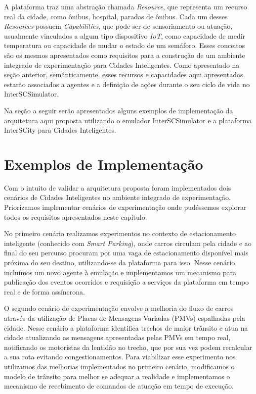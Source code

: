 A plataforma traz uma abstração chamada \textit{Resource}, que representa um recurso real da cidade, como ônibus, hospital, paradas de ônibus.
Cada um desses \textit{Resources} possuem \textit{Capabilities}, que pode ser de sensoriamento ou atuação, usualmente vinculados a algum tipo dispositivo \textit{IoT},
como capacidade de medir temperatura ou capacidade de mudar o estado de um semáforo.
Esses conceitos são os mesmos apresentados como requisitos para a construção de um ambiente integrado de experimentação para Cidades Inteligentes.
Como apresentado na seção anterior, semânticamente, esses recursos e capacidades aqui apresentados estarão associados a agentes e a definição de ações durante o seu
ciclo de vida no InterSCSimulator.

Na seção a seguir serão apresentados alguns exemplos de implementação da arquitetura aqui proposta utilizando o emulador InterSCSimulator e a plataforma InterSCity
para Cidades Inteligentes.

\section{Exemplos de Implementação}

Com o intuito de validar a arquitetura proposta foram implementados dois cenários de Cidades Inteligentes no ambiente integrado de experimentação.
Priorizamos implementar cenários de experimentação onde pudéssemos explorar todos os requisitos apresentados neste capítulo.

No primeiro cenário realizamos experimentos no contexto de estacionamento inteligente (conhecido com \textit{Smart Parking}), onde carros circulam pela cidade e ao
final do seu percurso procuram por uma vaga de estacionamento disponível mais próxima do seu destino, utilizando-se da plataforma para isso.
Nesse cenário, incluímos um novo agente à emulação e implementamos um mecanismo para publicação dos eventos ocorridos e requisição a serviços da plataforma em tempo real
e de forma assíncrona.

O segundo cenário de experimentação envolve a melhoria do fluxo de carros através da utilização de Placas de Mensagens Variadas (PMVs) espalhadas pela cidade.
Nesse cenário a plataforma identifica trechos de maior trânsito e atua na cidade atualizando as mensagens apresentadas pelas PMVs em tempo real, notificando os
motoristas da lentidão no trecho, que por sua vez podem recalcular a sua rota evitando congestionamentos.
Para viabilizar esse experimento nos utilizamos das melhorias implementados no primeiro cenário, modificamos o modelo de trânsito para melhor se adequar a realidade e
implementamos o mecanismo de recebimento de comandos de atuação em tempo de execução.


